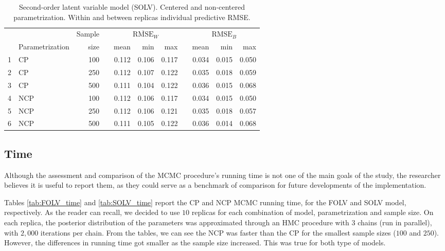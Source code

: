 \begin{table}[H]
	\centering
	\begin{tabular}{rlrrrrrrrrr}
		\hline
		&  & Sample && \multicolumn{3}{c}{ $\overline{\text{RMSE}}_{W}$ } && \multicolumn{3}{c}{ $\text{RMSE}_{B}$ } \\
		\cmidrule(rl){5-7} \cmidrule(rl){9-11}  
		& Parametrization & size  && mean & min & max && mean & min & max \\ 
		\hline\hline
		1 & CP & 100 && 0.112 & 0.106 & 0.117 && 0.034 & 0.015 & 0.050 \\ 
		2 & CP & 250 && 0.112 & 0.107 & 0.122 && 0.035 & 0.018 & 0.059 \\ 
		3 & CP & 500 && 0.111 & 0.104 & 0.122 && 0.036 & 0.015 & 0.068 \\ 
		\hline
		4 & NCP & 100 && 0.112 & 0.106 & 0.117 && 0.034 & 0.015 & 0.050 \\
		5 & NCP & 250 && 0.112 & 0.106 & 0.121 && 0.035 & 0.018 & 0.057 \\
		6 & NCP & 500 && 0.111 & 0.105 & 0.122 && 0.036 & 0.014 & 0.068 \\ 
		\hline
	\end{tabular}
	\caption[Second-order latent variable model (SOLV). Centered and non-centered parametrization. Within and between replicas individual predictive RMSE.]%
	{Second-order latent variable model (SOLV). Centered and non-centered parametrization. Within and between replicas individual predictive RMSE.}
	\label{tab:SOLV_accuracy}
\end{table}




\subsection{Time}

Although the assessment and comparison of the MCMC procedure's running time is not one of the main goals of the study, the researcher believes it is useful to report them, as they could serve as a benchmark of comparison for future developments of the implementation.

Tables \ref{tab:FOLV_time} and \ref{tab:SOLV_time} report the CP and NCP MCMC running time, for the FOLV and SOLV model, respectively. As the reader can recall, we decided to use $10$ replicas for each combination of model, parametrization and sample size. On each replica, the posterior distribution of the parameters was approximated through an HMC procedure with $3$ chains (run in parallel), with $2,000$ iterations per chain. From the tables, we can see the NCP was faster than the CP for the smallest sample sizes ($100$ and $250$).  However, the differences in running time got smaller as the sample size increased. This was true for both type of models. 

